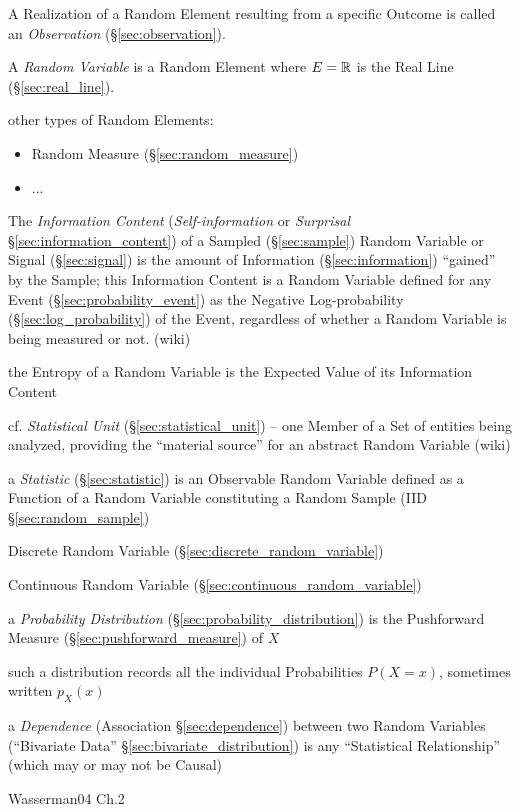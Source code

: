 A Realization of a Random Element resulting from a specific Outcome is called an
\emph{Observation} (\S\ref{sec:observation}).

A \emph{Random Variable} is a Random Element where $E = \mathbb{R}$ is the Real Line
(\S\ref{sec:real_line}).

other types of Random Elements:
\begin{itemize}
  \item Random Measure (\S\ref{sec:random_measure})
  \item ...
\end{itemize}

The \emph{Information Content} (\emph{Self-information} or \emph{Surprisal}
\S\ref{sec:information_content}) of a Sampled (\S\ref{sec:sample}) Random
Variable or Signal (\S\ref{sec:signal}) is the amount of Information
(\S\ref{sec:information}) ``gained'' by the Sample; this Information Content is
a Random Variable defined for any Event (\S\ref{sec:probability_event}) as the
Negative Log-probability (\S\ref{sec:log_probability}) of the Event,
regardless of whether a Random Variable is being measured or not. (wiki)

the Entropy of a Random Variable is the Expected Value of its Information
Content

\fist cf. \emph{Statistical Unit} (\S\ref{sec:statistical_unit}) -- one Member
of a Set of entities being analyzed, providing the ``material source'' for an
abstract Random Variable (wiki)

\fist a \emph{Statistic} (\S\ref{sec:statistic}) is an Observable Random
Variable defined as a Function of a Random Variable constituting a Random Sample
(IID \S\ref{sec:random_sample})

Discrete Random Variable (\S\ref{sec:discrete_random_variable})

Continuous Random Variable (\S\ref{sec:continuous_random_variable})

a \emph{Probability Distribution} (\S\ref{sec:probability_distribution})
is the Pushforward Measure (\S\ref{sec:pushforward_measure}) of $X$

such a distribution records all the individual Probabilities $P(X = x)$,
sometimes written $p_X(x)$

a \emph{Dependence} (Association \S\ref{sec:dependence}) between two Random
Variables (``Bivariate Data'' \S\ref{sec:bivariate_distribution}) is any
``Statistical Relationship'' (which may or may not be Causal)

Wasserman04 Ch.2

